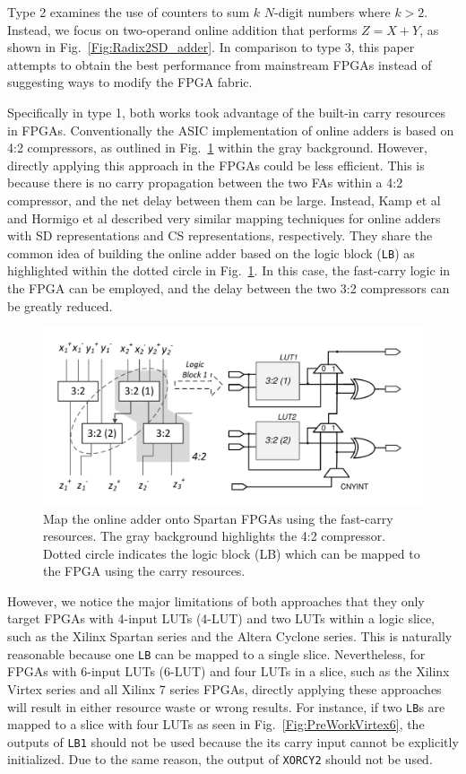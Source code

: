\documentclass[conference]{IEEEtran}
\begin{document}
Type 2 examines the use of counters to sum $k$ $N$-digit numbers where $k>2$. Instead, we focus on two-operand online addition that performs $Z=X+Y$, as shown in Fig.~\ref{Fig:Radix2SD_adder}. In comparison to type 3, this paper attempts to obtain the best performance from mainstream FPGAs instead of suggesting ways to modify the FPGA fabric.

Specifically in type 1, both works took advantage of the built-in carry resources in FPGAs. Conventionally the ASIC implementation of online adders is based on 4:2 compressors, as outlined in Fig.~\ref{Fig:PreviousWork} within the gray background. However, directly applying this approach in the FPGAs could be less efficient. This is because there is no carry propagation between the two FAs within a 4:2 compressor, and the net delay between them can be large. Instead, Kamp et al \cite{FPT09RA} and Hormigo et al \cite{ASAP09RA} described very similar mapping techniques for online adders with SD representations and CS representations, respectively. They share the common idea of building the online adder based on the logic block (\texttt{LB}) as highlighted within the dotted circle in Fig.~\ref{Fig:PreviousWork}. In this case, the fast-carry logic in the FPGA can be employed, and the delay between the two 3:2 compressors can be greatly reduced.

\begin{figure}[tbp]
	\centering
	\includegraphics[width=.5\textwidth]{./Figures/SDAdder_42comp_Spartan2.pdf}
	\caption{Map the online adder onto Spartan FPGAs using the fast-carry resources. The gray background highlights the 4:2 compressor. Dotted circle indicates the logic block (LB) which can be mapped to the FPGA using the carry resources.}
	\vspace{-1ex}
	\label{Fig:PreviousWork}
\end{figure}

However, we notice the major limitations of both approaches that they only target FPGAs with 4-input LUTs (4-LUT) and two LUTs within a logic slice, such as the Xilinx Spartan series and the Altera Cyclone series. This is naturally reasonable because one \texttt{LB} can be mapped to a single slice. Nevertheless, for FPGAs with 6-input LUTs (6-LUT) and four LUTs in a slice, such as the Xilinx Virtex series and all Xilinx 7 series FPGAs, directly applying these approaches will result in either resource waste or wrong results. For instance, if two \texttt{LB}s are mapped to a slice with four LUTs as seen in Fig.~\ref{Fig:PreWorkVirtex6}, the outputs of \texttt{LB1} should not be used because the its carry input cannot be explicitly initialized. Due to the same reason, the output of \texttt{XORCY2} should not be used.
\end{document}

